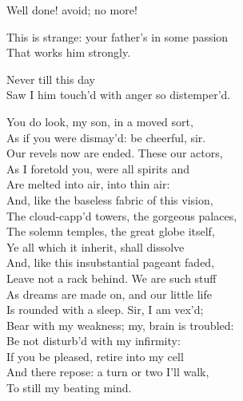 
\begin{verse_speech}[Prospero] 
Well done! avoid; no more!
\end{verse_speech}

\begin{verse_speech}[Ferdinand] 
This is strange: your father's in some passion\\
That works him strongly.
\end{verse_speech}

\begin{verse_speech}[Miranda] 
Never till this day\\
Saw I him touch'd with anger so distemper'd.
\end{verse_speech}

\begin{verse_speech}[Prospero] 
You do look, my son, in a moved sort,\\
As if you were dismay'd: be cheerful, sir.\\
Our revels now are ended. These our actors,\\
As I foretold you, were all spirits and\\
Are melted into air, into thin air:\\
And, like the baseless fabric of this vision,\\
The cloud-capp'd towers, the gorgeous palaces,\\
The solemn temples, the great globe itself,\\
Ye all which it inherit, shall dissolve\\
And, like this insubstantial pageant faded,\\
Leave not a rack behind. We are such stuff\\
As dreams are made on, and our little life\\
Is rounded with a sleep. Sir, I am vex'd;\\
Bear with my weakness; my, brain is troubled:\\
Be not disturb'd with my infirmity:\\
If you be pleased, retire into my cell\\
And there repose: a turn or two I'll walk,\\
To still my beating mind.
\end{verse_speech}

